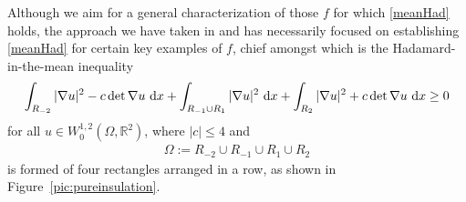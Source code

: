 \documentclass[12pt]{amsart}
\newcommand{\md}{{\rm d}}
\newcommand{\dx}{\, \md x}
\newcommand{\R}{\mathbb{R}}
\newcommand{\om}{\Omega}
\newcommand{\1}{{\bf 1}}
\begin{document}
Although we aim for a general characterization of those $f$ for which \eqref{meanHad} holds, the approach we have taken in \cite{BKV23} and \cite{BKV25} has necessarily focused on establishing \eqref{meanHad} for certain key examples of $f$, chief amongst which is the Hadamard-in-the-mean inequality 
\begin{align}\label{ins:c}
    \int_{R_{-2}} |\nabla u|^2 - c \det \nabla u \, \dx + \int_{R_{-1}\cup R_{1}} |\nabla u|^2 \, \dx + 
    \int_{R_{2}} |\nabla u|^2 + c \det \nabla u \, \dx \geq  0
\end{align}
for all $u \in W_0^{1,2}(\om,\R^2)$, where $|c| \leq 4$ and
\begin{align}\label{Omega}
\Omega := R_{-2} \cup R_{-1} \cup R_1 \cup R_2
\end{align}
is formed of four rectangles arranged in a row, as shown in Figure~\ref{pic:pureinsulation}. 
\end{document}
